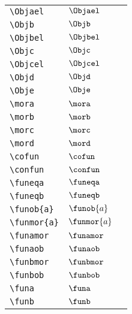 \begin{longtable}{lll}
 {\color[rgb]{0.5,0.5,0.5}\texttt{\textbackslash Objael}} & $\Objael$ & \\ 
 {\color[rgb]{0.5,0.5,0.5}\texttt{\textbackslash Objb}} & $\Objb$ & \\ 
 {\color[rgb]{0.5,0.5,0.5}\texttt{\textbackslash Objbel}} & $\Objbel$ & \\ 
 {\color[rgb]{0.5,0.5,0.5}\texttt{\textbackslash Objc}} & $\Objc$ & \\ 
 {\color[rgb]{0.5,0.5,0.5}\texttt{\textbackslash Objcel}} & $\Objcel$ & \\ 
 {\color[rgb]{0.5,0.5,0.5}\texttt{\textbackslash Objd}} & $\Objd$ & \\ 
 {\color[rgb]{0.5,0.5,0.5}\texttt{\textbackslash Obje}} & $\Obje$ & \\ 
 {\color[rgb]{0.5,0.5,0.5}\texttt{\textbackslash mora}} & $\mora$ & \\ 
 {\color[rgb]{0.5,0.5,0.5}\texttt{\textbackslash morb}} & $\morb$ & \\ 
 {\color[rgb]{0.5,0.5,0.5}\texttt{\textbackslash morc}} & $\morc$ & \\ 
 {\color[rgb]{0.5,0.5,0.5}\texttt{\textbackslash mord}} & $\mord$ & \\ 
 {\color[rgb]{0.5,0.5,0.5}\texttt{\textbackslash cofun}} & $\cofun$ & \\ 
 {\color[rgb]{0.5,0.5,0.5}\texttt{\textbackslash confun}} & $\confun$ & \\ 
 {\color[rgb]{0.5,0.5,0.5}\texttt{\textbackslash funeqa}} & $\funeqa$ & \\ 
 {\color[rgb]{0.5,0.5,0.5}\texttt{\textbackslash funeqb}} & $\funeqb$ & \\ 
 {\color[rgb]{0.5,0.5,0.5}\texttt{\textbackslash funob\{a\}}} & $\funob{a}$ & \\ 
 {\color[rgb]{0.5,0.5,0.5}\texttt{\textbackslash funmor\{a\}}} & $\funmor{a}$ & \\ 
 {\color[rgb]{0.5,0.5,0.5}\texttt{\textbackslash funamor}} & $\funamor$ & \\ 
 {\color[rgb]{0.5,0.5,0.5}\texttt{\textbackslash funaob}} & $\funaob$ & \\ 
 {\color[rgb]{0.5,0.5,0.5}\texttt{\textbackslash funbmor}} & $\funbmor$ & \\ 
 {\color[rgb]{0.5,0.5,0.5}\texttt{\textbackslash funbob}} & $\funbob$ & \\ 
 {\color[rgb]{0.5,0.5,0.5}\texttt{\textbackslash funa}} & $\funa$ & \\ 
 {\color[rgb]{0.5,0.5,0.5}\texttt{\textbackslash funb}} & $\funb$ & \\ 

\end{longtable}
